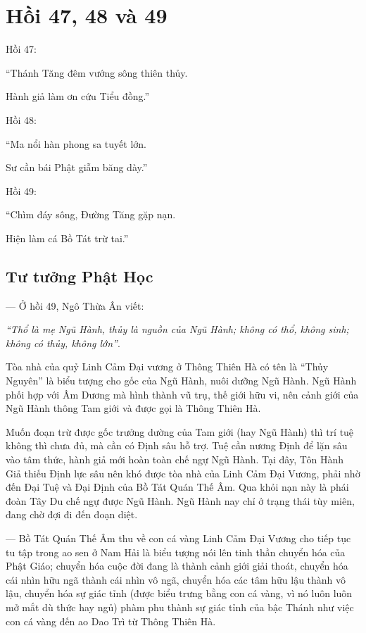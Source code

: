 \chapter{Hồi 47, 48 và 49} %
\label{cha:hoi_47_48}

Hồi 47:

\begin{itshape}
``Thánh Tăng đêm vướng sông thiên thủy.

Hành giả làm ơn cứu Tiểu đồng.''
\end{itshape}

Hồi 48:

\begin{itshape}
``Ma nổi hàn phong sa tuyết lớn.

Sư cần bái Phật giẫm băng dày.''
\end{itshape}

Hồi 49:

\begin{itshape}
``Chìm đáy sông, Đường Tăng gặp nạn.

Hiện làm cá Bồ Tát trừ tai.''
\end{itshape}

\section{Tư tưởng Phật Học} %
\label{sec:47_48_phat_hoc}

--- Ở hồi 49, Ngô Thừa Ân viết:

\emph{``Thổ là mẹ Ngũ Hành, thủy là nguồn của Ngũ Hành; không có thổ, không sinh; không có thủy, không lớn''}.

Tòa nhà của quỷ Linh Cảm Đại vương ở Thông Thiên Hà có tên là ``Thủy Nguyên'' là biểu tượng cho gốc của Ngũ Hành, nuôi dưỡng Ngũ Hành. Ngũ Hành phối hợp với Âm Dương mà hình thành vũ trụ, thế giới hữu vi, nên cảnh giới của Ngũ Hành thông Tam giới và được gọi là Thông Thiên Hà.

Muốn đoạn trừ được gốc trưởng dường của Tam giới (hay Ngũ Hành) thì trí tuệ không thì chưa đủ, mà cần có Định sâu hỗ trợ. Tuệ cần nương Định để lặn sâu vào tâm thức, hành giả mới hoàn toàn chế ngự Ngũ Hành. Tại đây, Tôn Hành Giả thiếu Định lực sâu nên khó được tòa nhà của Linh Cảm Đại Vương, phải nhờ đến Đại Tuệ và Đại Định của Bồ Tát Quán Thế Âm. Qua khỏi nạn này là phái đoàn Tây Du chế ngự được Ngũ Hành. Ngũ Hành nay chỉ ở trạng thái tùy miên, đang chờ đợi đi đến đoạn diệt.

--- Bồ Tát Quán Thế Âm thu về con cá vàng Linh Cảm Đại Vương cho tiếp tục tu tập trong ao sen ở Nam Hải là biểu tượng nói lên tinh thần chuyển hóa của Phật Giáo; chuyển hóa cuộc đời đang là thành cảnh giới giải thoát, chuyển hóa cái nhìn hữu ngã thành cái nhìn vô ngã, chuyển hóa các tâm hữu lậu thành vô lậu, chuyển hóa sự giác tỉnh (được biểu trưng bằng con cá vàng, vì nó luôn luôn mở mắt dù thức hay ngủ) phàm phu thành sự giác tỉnh của bậc Thánh như việc con cá vàng đến ao Dao Trì từ Thông Thiên Hà.

